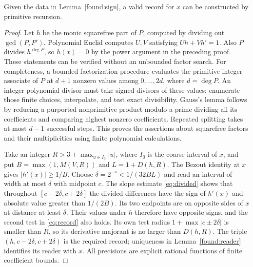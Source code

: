 \begin{lemma}\label{found:convert}
Given the data in Lemma~\ref{found:sign}, a valid record for $x$ can be
constructed by primitive recursion.
\end{lemma}
\begin{proof}
Let $h$ be the monic squarefree part of $P$, computed by dividing out
$\gcd(P,P')$. Polynomial Euclid computes $U,V$ satisfying
$Uh+Vh'=1$. Also $P$ divides $h^{\deg P}$, so $h(x)=0$ by the
power argument in the preceding proof. These statements can be verified
without an unbounded factor search. For completeness, a bounded
factorization procedure evaluates the primitive integer associate of $P$
at $d+1$ nonzero values among $0,\ldots,2d$, where $d=\deg P$.
An integer polynomial divisor must take signed divisors of these values;
enumerate those finite choices, interpolate, and test exact divisibility.
Gauss's lemma follows by reducing a purported nonprimitive product modulo
a prime dividing all its coefficients and comparing highest nonzero
coefficients. Repeated splitting takes at most $d-1$ successful steps.
This proves the assertions about squarefree factors and their
multiplicities using finite polynomial calculations.

Take an integer $R>3+\max_{u\in I_0}|u|$, where $I_0$ is the coarse
interval of $x$, and put $B=\max(1,M(V,R))$ and
$L=1+D(h,R)$. The Bezout identity at $x$ gives
$|h'(x)|\ge1/B$. Choose $\delta=2^{-s}<1/(32BL)$ and read an interval
of width at most $\delta$ with midpoint $c$. The slope estimate
\eqref{eq:divided} shows that throughout $[c-2\delta,c+2\delta]$
the divided differences have the sign of $h'(x)$ and absolute value
greater than $1/(2B)$. Its two endpoints are on opposite sides of $x$
at distance at least $\delta$. Their values under $h$ therefore have
opposite signs, and the second test in \eqref{eq:record} also holds.
Its own test radius $1+\max|c\pm2\delta|$ is smaller than $R$, so
its derivative majorant is no larger than $D(h,R)$.
The triple $(h,c-2\delta,c+2\delta)$ is the required record; uniqueness
in Lemma~\ref{found:reader} identifies its reader with $x$.
All precisions are explicit rational functions of finite coefficient bounds.
\end{proof}

